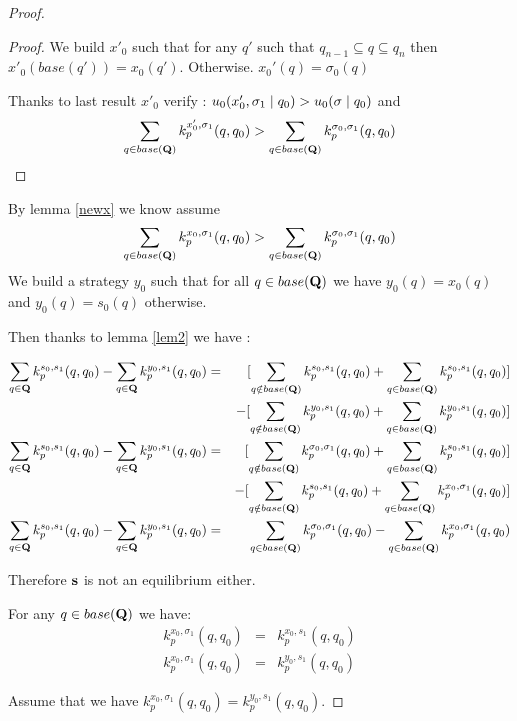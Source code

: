 \begin{proof}
\begin{proof}
We build $x'_0$ such that for any $q'$  such that $q_{n-1} \subseteq q \subseteq q_{n}$ then $x'_0(base(q')) = x_0(q')$. Otherwise. $x_0'(q) = \sigma_0(q)$ 

Thanks to last result $x'_0$ verify : $u_0(x_0',\sigma_1 \mid q_0) > u_0(\mathbf{\sigma} \mid q_0)$ and $$\sum_{q \in base(\mathbf{Q})} k^{x_0',\sigma_1}_p(q,q_0) >  \sum_{q \in base(\mathbf{Q})} k^{\sigma_0,\sigma_1}_p(q,q_0) $$


	\end{proof}
	
	By lemma \ref{newx} we know assume $$\sum_{q \in base(\mathbf{Q})} k^{x_0,\sigma_1}_p(q,q_0) >  \sum_{q \in base(\mathbf{Q})} k^{\sigma_0,\sigma_1}_p(q,q_0) $$
	We build a strategy $y_0$ such that for all $q \in base(\mathbf{Q})$ we have $y_0(q) = x_0(q)$ and $y_0(q) = s_0(q)$ otherwise.
	
	Then thanks to lemma \ref{lem2} we have :
	
	\begin{eqnarray*}
		\sum_{q \in \mathbf{Q}} k^{s_0,s_1}_p(q,q_0) - \sum_{q \in \mathbf{Q}} k^{y_0,s_1}_p(q,q_0) & = & [\sum_{q \notin base(\mathbf{Q})} k^{s_0,s_1}_p(q,q_0) + 	\sum_{q \in base(\mathbf{Q})} k^{s_0,s_1}_p(q,q_0)]\\
		 && - [\sum_{q \notin base(\mathbf{Q})} k^{y_0,s_1}_p(q,q_0) + \sum_{q \in base(\mathbf{Q})} k^{y_0,s_1}_p(q,q_0)]\\
		 \sum_{q \in \mathbf{Q}} k^{s_0,s_1}_p(q,q_0) - \sum_{q \in \mathbf{Q}} k^{y_0,s_1}_p(q,q_0) & = & [\sum_{q \notin base(\mathbf{Q})} k^{\sigma_0,\sigma_1}_p(q,q_0) + 	\sum_{q \in base(\mathbf{Q})} k^{s_0,s_1}_p(q,q_0)]\\
		 && - [\sum_{q \notin base(\mathbf{Q})} k^{s_0,s_1}_p(q,q_0) + \sum_{q \in base(\mathbf{Q})} k^{x_0,\sigma_1}_p(q,q_0)]\\
		 \sum_{q \in \mathbf{Q}} k^{s_0,s_1}_p(q,q_0) - \sum_{q \in \mathbf{Q}} k^{y_0,s_1}_p(q,q_0) & = & \sum_{q \in base(\mathbf{Q})} k^{\sigma_0,\sigma_1}_p(q,q_0) -\sum_{q \in base(\mathbf{Q})} k^{x_0,\sigma_1}_p(q,q_0) \\
	\end{eqnarray*}

Therefore $\mathbf{s}$ is not an equilibrium either.
	
	\iffalse

	For any $q \in base(\mathbf{Q})$ we have: 
	\begin{eqnarray*}
		k^{x_0,\sigma_1}_p(q,q_0) & =  &k^{x_0,s_1}_p(q,q_0) \\
		k^{x_0,\sigma_1}_p(q,q_0) & =  &k^{y_0,s_1}_p(q,q_0)
	\end{eqnarray*}
	
	Assume that we have $k^{x_0,\sigma_1}_p(q,q_0) = k^{y_0,s_1}_p(q,q_0)$. 
	

\end{proof}
